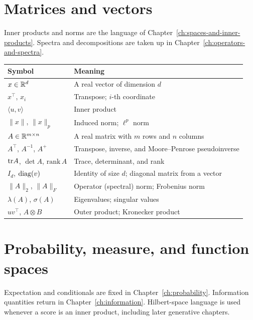 \section*{Matrices and vectors}
\label{not:linear}

Inner products and norms are the language of Chapter~\ref{ch:spaces-and-inner-products}. Spectra and decompositions are taken up in Chapter~\ref{ch:operators-and-spectra}.

\begin{table}[htbp]
\centering
{}
\label{tab:notation-linear}
\begin{tabular}{@{}ll@{}}
\toprule
Symbol & Meaning \\
\midrule
$x\in\mathbb{R}^d$ & A real vector of dimension $d$ \\
$x^\top$, $x_i$ & Transpose; $i$-th coordinate \\
$\langle u,v\rangle$ & Inner product \\
$\lVert x\rVert$, $\lVert x\rVert_p$ & Induced norm; $\ell^p$ norm \\
$A\in\mathbb{R}^{m\times n}$ & A real matrix with $m$ rows and $n$ columns \\
$A^\top$, $A^{-1}$, $A^{+}$ & Transpose, inverse, and Moore--Penrose pseudoinverse \\
$\mathrm{tr} A$, $\det A$, $\mathrm{rank}\,A$ & Trace, determinant, and rank \\
$I_d$, $\mathrm{diag}(v)$ & Identity of size $d$; diagonal matrix from a vector \\
$\lVert A\rVert_2$, $\lVert A\rVert_F$ & Operator (spectral) norm; Frobenius norm \\
$\lambda(A)$, $\sigma(A)$ & Eigenvalues; singular values \\
$uv^\top$, $A\otimes B$ & Outer product; Kronecker product \\
\bottomrule
\end{tabular}
\end{table}

\section*{Probability, measure, and function spaces}
\label{not:probability}

Expectation and conditionals are fixed in Chapter~\ref{ch:probability}. Information quantities return in Chapter~\ref{ch:information}. Hilbert-space language is used whenever a score is an inner product, including later generative chapters.

